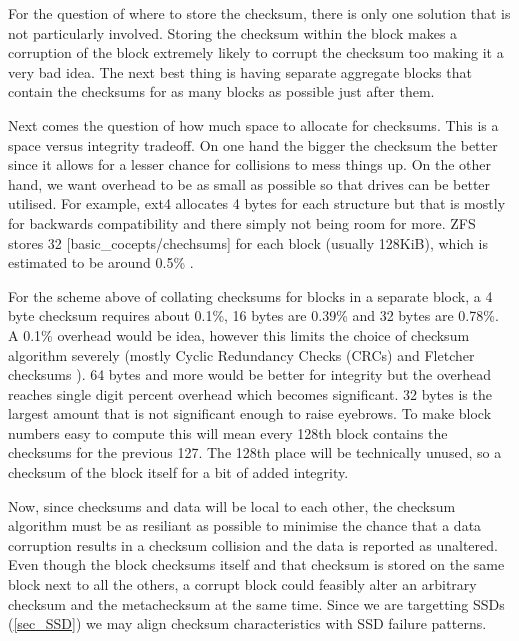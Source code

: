         For the question of where to store the checksum, there is only one
        solution that is not particularly involved. Storing the checksum within
        the block makes a corruption of the block extremely likely to corrupt
        the checksum too making it a very bad idea. The next best thing is
        having separate aggregate blocks that contain the checksums for as many
        blocks as possible just after them.

        Next comes the question of how much space to allocate for checksums.
        This is a space versus integrity tradeoff. On one hand the bigger the
        checksum the better since it allows for a lesser chance for collisions
        to mess things up. On the other hand, we want overhead to be as small
        as possible so that drives can be better utilised. For example, ext4
        allocates 4 bytes for each structure \cite{ext4_docs} but that is
        mostly for backwards compatibility and there simply not being room for
        more. ZFS stores 32 \cite{ZFS_docs}[basic\_cocepts/chechsums] for each
        block (usually 128KiB), which is estimated to be around 0.5\%
        \cite{ZFS_overhead}.

        For the scheme above of collating checksums for blocks in a separate
        block, a 4 byte checksum requires about 0.1\%, 16 bytes are 0.39\% and
        32 bytes are 0.78\%. A 0.1\% overhead would be idea, however this
        limits the choice of checksum algorithm severely (mostly Cyclic
        Redundancy Checks (CRCs) and Fletcher checksums
        \cite{embedded_checksums}). 64 bytes and more would be better for
        integrity but the overhead reaches single digit percent overhead which
        becomes significant. 32 bytes is the largest amount that is not
        significant enough to raise eyebrows. To make block numbers easy to
        compute this will mean every 128th block contains the checksums for the
        previous 127. The 128th place will be technically unused, so a checksum
        of the block itself for a bit of added integrity.

        Now, since checksums and data will be local to each other, the checksum
        algorithm must be as resiliant as possible to minimise the chance that
        a data corruption results in a checksum collision and the data is
        reported as unaltered. Even though the block checksums itself and that
        checksum is stored on the same block next to all the others, a corrupt
        block could feasibly alter an arbitrary checksum and the metachecksum
        at the same time. Since we are targetting SSDs (\ref{sec_SSD}) we may
        align checksum characteristics with SSD failure patterns.

